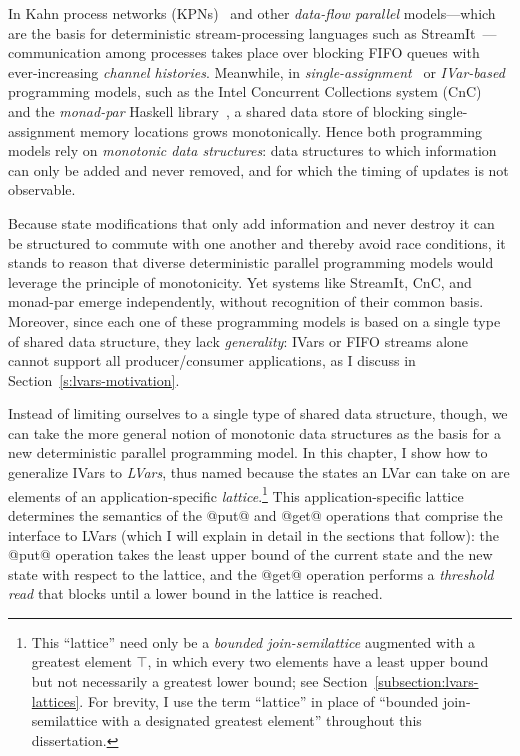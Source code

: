 In Kahn process networks (KPNs)~\cite{Kahn-1974} and other
\emph{data-flow parallel} models---which are the basis for
deterministic stream-processing languages such as
StreamIt~\cite{streamit-asplos}---communication among processes takes
place over blocking FIFO queues with ever-increasing \emph{channel
  histories}.  Meanwhile, in
\emph{single-assignment}~\cite{Tesler-1968} or
\emph{IVar-based}~\cite{IStructures} programming models, such as the
Intel Concurrent Collections system (CnC)~\cite{CnC} and the
\emph{monad-par} Haskell library~\cite{monad-par}, a shared data store
of blocking single-assignment memory locations grows monotonically.
Hence both programming models rely on \emph{monotonic data
structures}: data structures to which information can only be added
and never removed, and for which the timing of updates is not
observable.

Because state modifications that only add information and never
destroy it can be structured to commute with one another and thereby
avoid race conditions, it stands to reason that diverse deterministic
parallel programming models would leverage the principle of
monotonicity.  Yet systems like StreamIt, CnC, and monad-par emerge
independently, without recognition of their common basis.  Moreover,
since each one of these programming models is based on a single type
of shared data structure, they lack \emph{generality}: IVars or FIFO
streams alone cannot support all producer/consumer applications, as I
discuss in Section~\ref{s:lvars-motivation}.

Instead of limiting ourselves to a single type of shared data
structure, though, we can take the more general notion of monotonic
data structures as the basis for a new deterministic parallel
programming model.  In this chapter, I show how to generalize IVars
to \emph{LVars}, thus named because the states an LVar can take on are
elements of an application-specific \emph{lattice}.\footnote{This
``lattice'' need only be a \emph{bounded join-semilattice} augmented
with a greatest element $\top$, in which every two elements have a
least upper bound but not necessarily a greatest lower bound; see
Section~\ref{subsection:lvars-lattices}.  For brevity, I use the term
``lattice'' in place of ``bounded join-semilattice with a designated
greatest element'' throughout this dissertation.}  This
application-specific lattice determines the semantics of the @put@ and
@get@ operations that comprise the interface to LVars (which I will
explain in detail in the sections that follow): the @put@ operation
takes the least upper bound of the current state and the new state
with respect to the lattice, and the @get@ operation performs
a \emph{threshold read} that blocks until a lower bound in the lattice
is reached.

